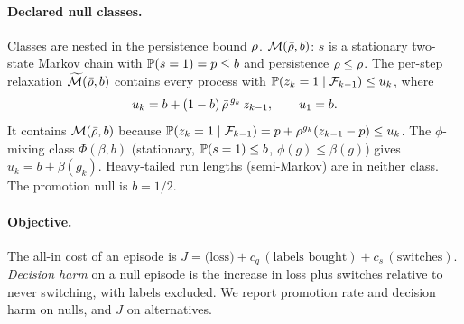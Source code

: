\paragraph{Declared null classes.} Classes are nested in the persistence bound $\bar\rho$.
$\mathcal M(\bar\rho,b)$: $s$ is a stationary two-state Markov chain with $\mathbb{P}(s=1)=p\le b$ and
persistence $\rho\le\bar\rho$. The per-step relaxation $\widetilde{\mathcal M}(\bar\rho,b)$ contains every
process with $\mathbb{P}(z_k=1\mid\mathcal{F}_{k-1})\le u_k$, where
\begin{equation}\label{eq:envelope}
u_k = b+(1-b)\,\bar\rho^{\,g_k}\,z_{k-1},\qquad u_1=b .
\end{equation}
It contains $\mathcal M(\bar\rho,b)$ because $\mathbb{P}(z_k=1\mid\mathcal{F}_{k-1})=p+\rho^{g_k}(z_{k-1}-p)\le u_k$.
The $\phi$-mixing class $\Phi(\beta,b)$ (stationary, $\mathbb{P}(s=1)\le b$, $\phi(g)\le\beta(g)$) gives
$u_k=b+\beta(g_k)$. Heavy-tailed run lengths (semi-Markov) are in neither class. The promotion null is
$b=1/2$.

\paragraph{Objective.} The all-in cost of an episode is
$J = \text{(loss)} + c_q\,(\text{labels bought}) + c_s\,(\text{switches})$.
\emph{Decision harm} on a null episode is the increase in loss plus switches relative to never
switching, with labels excluded. We report promotion rate and decision harm on nulls, and $J$ on
alternatives.
